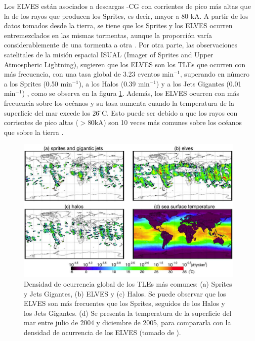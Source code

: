 \documentclass[12pt,oneside,openany,letter]{book}
\begin{document}
Los ELVES están asociados a descargas -CG con corrientes de pico más altas que la de los rayos que producen los Sprites, es decir, mayor a 80 kA. A partir de los datos tomados desde la tierra, se tiene que los Sprites y los ELVES ocurren entremezclados en las mismas tormentas, aunque la proporción varía considerablemente de una tormenta a otra \cite{FullekrugEtal2006}. Por otra parte, las observaciones satelitales de la misi\'on espacial ISUAL (Imager of Sprites and Upper Atmospheric Lightning), sugieren que los ELVES son los TLEs que ocurren con m\'as frecuencia, con una tasa global de 3.23 eventos min$^{-1}$, superando en número a los Sprites (0.50 min$^{-1}$), a los Halos (0.39 min$^{-1}$) y a los Jets Gigantes (0.01 min$^{-1}$) \cite{chen2008}, como se observa en la figura \ref{fig:TLE_global_rate}. Además, los ELVES ocurren con más frecuencia sobre los océanos y su tasa aumenta cuando la temperatura de la superficie del mar excede los 26$^{\circ}$C. Esto puede ser debido a que los rayos con corrientes de pico altas ($>80$kA) son 10 veces más comunes sobre los océanos que sobre la tierra \cite{chen2008}. 

\begin{figure}
    \centering
    \includegraphics[scale=0.33]{figures/TLE_global_rate.png}
    \caption[Densidad de ocurrencia global de los TLEs m\'as comunes]{Densidad de ocurrencia global de los TLEs m\'as comunes: (a) Sprites y Jets Gigantes, (b) ELVES y (c) Halos. Se puede observar que los ELVES son m\'as frecuentes que los Sprites, seguidos de los Halos y los Jets Gigantes. (d) Se presenta la temperatura de la superficie del mar entre julio de 2004 y diciembre de 2005, para compararla con la densidad de ocurrencia de los ELVES (tomado de \cite{chen2008}).}
    \label{fig:TLE_global_rate}
\end{figure}
\end{document}

